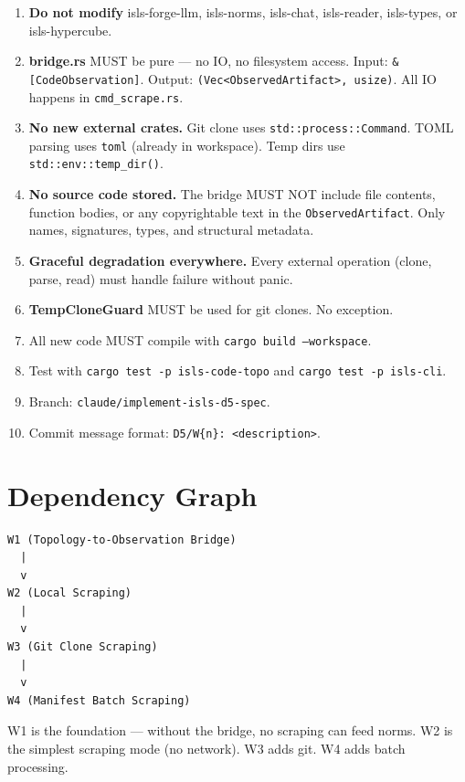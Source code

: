 \documentclass[11pt,a4paper]{article}
\begin{document}
\begin{enumerate}
\item \textbf{Do not modify} isls-forge-llm, isls-norms, isls-chat,
      isls-reader, isls-types, or isls-hypercube.
\item \textbf{bridge.rs} MUST be pure --- no IO, no filesystem access.
      Input: \texttt{\&[CodeObservation]}. Output:
      \texttt{(Vec<ObservedArtifact>, usize)}. All IO happens in
      \texttt{cmd\_scrape.rs}.
\item \textbf{No new external crates.} Git clone uses
      \texttt{std::process::Command}. TOML parsing uses \texttt{toml}
      (already in workspace). Temp dirs use \texttt{std::env::temp\_dir()}.
\item \textbf{No source code stored.} The bridge MUST NOT include file
      contents, function bodies, or any copyrightable text in the
      \texttt{ObservedArtifact}. Only names, signatures, types, and
      structural metadata.
\item \textbf{Graceful degradation everywhere.} Every external operation
      (clone, parse, read) must handle failure without panic.
\item \textbf{TempCloneGuard} MUST be used for git clones. No
      exception.
\item All new code MUST compile with \texttt{cargo build --workspace}.
\item Test with \texttt{cargo test -p isls-code-topo} and
      \texttt{cargo test -p isls-cli}.
\item Branch: \texttt{claude/implement-isls-d5-spec}.
\item Commit message format: \texttt{D5/W\{n\}: <description>}.
\end{enumerate}


\section{Dependency Graph}

\begin{verbatim}
W1 (Topology-to-Observation Bridge)
  |
  v
W2 (Local Scraping)
  |
  v
W3 (Git Clone Scraping)
  |
  v
W4 (Manifest Batch Scraping)
\end{verbatim}

W1 is the foundation --- without the bridge, no scraping can feed norms.
W2 is the simplest scraping mode (no network). W3 adds git.
W4 adds batch processing.
\end{document}
